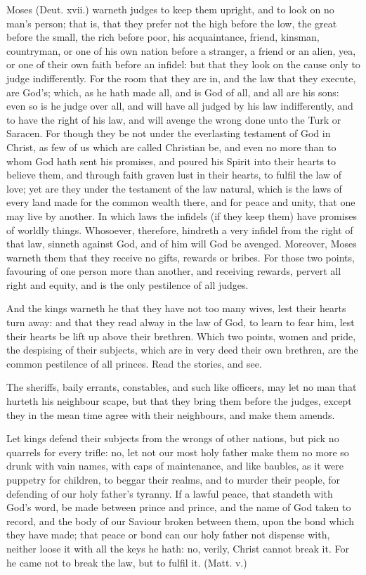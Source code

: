 Moses (Deut. xvii.) warneth judges to keep them upright,
and to look on no man's person; that is, that they 
prefer not the high before the low, the great before the 
small, the rich before poor, his acquaintance, friend, 
kinsman, countryman, or one of his own nation before 
a stranger, a friend or an alien, yea, or one of their own 
faith before an infidel: but that they look on the cause 
only to judge indifferently. For the room that they are 
in, and the law that they execute, are God's; which, as 
he hath made all, and is God of all, and all are his sons: 
even so is he judge over all, and will have all judged by 
his law indifferently, and to have the right of his law, and 
will avenge the wrong done unto the Turk or Saracen. 
For though they be not under the everlasting testament of 
God in Christ, as few of us which are called Christian 
be, and even no more than to whom God hath sent his 
promises, and poured his Spirit into their hearts to believe
them, and through faith graven lust in their hearts, 
to fulfil the law of love; yet are they under the testament 
of the law natural, which is the laws of every land made 
for the common wealth there, and for peace and unity, 
that one may live by another. In which laws the infidels 
(if they keep them) have promises of worldly things. 
Whosoever, therefore, hindreth a very infidel from the 
right of that law, sinneth against God, and of him will 
God be avenged. Moreover, Moses warneth them that 
they receive no gifts, rewards or bribes. For those two 
points, favouring of one person more than another, and 
receiving rewards, pervert all right and equity, and is the 
only pestilence of all judges. 

And the kings warneth he that they have not too many 
wives, lest their hearts turn away: and that they read 
alway in the law of God, to learn to fear him, lest their 
hearts be lift up above their brethren. Which two points, 
women and pride, the despising of their subjects, which 
are in very deed their own brethren, are the common pestilence
of all princes. Read the stories, and see. 

The sheriffs, baily errants, constables, and such like officers, 
may let no man that hurteth his neighbour scape, but that 
they bring them before the judges, except they in the mean 
time agree with their neighbours, and make them amends. 

Let kings defend their subjects from the wrongs of other 
nations, but pick no quarrels for every trifle: no, let not 
our most holy father make them no more so drunk with 
vain names, with caps of maintenance, and like baubles, 
as it were puppetry for children, to beggar their realms, 
and to murder their people, for defending of our holy 
father's tyranny. If a lawful peace, that standeth with 
God's word, be made between prince and prince, and 
the name of God taken to record, and the body of our 
Saviour broken between them, upon the bond which they 
have made; that peace or bond can our holy father not 
dispense with, neither loose it with all the keys he hath:
no, verily, Christ cannot break it. For he came not to 
break the law, but to fulfil it. (Matt. v.) 

